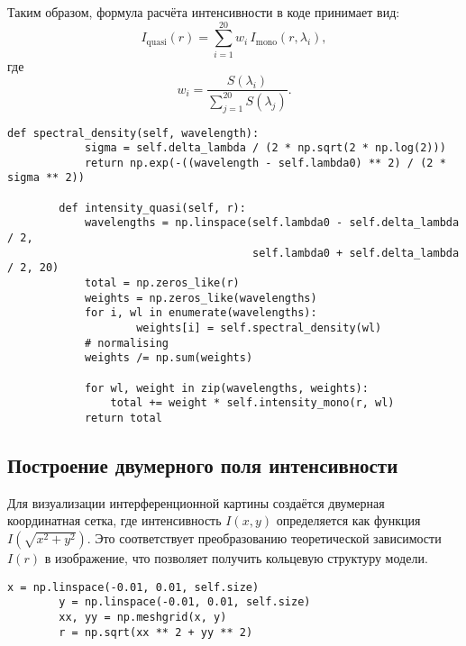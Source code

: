 \documentclass[a4paper,11pt]{article}
\theoremstyle{definition}
\begin{document}
\begin{itemize}
        Таким образом, формула расчёта интенсивности в коде принимает вид:
        \[
        I_{\text{quasi}}(r) = \sum_{i=1}^{20} w_i \, I_{\text{mono}}(r, \lambda_i),
        \]
        где
        \[
        w_i = \frac{S(\lambda_i)}{\sum_{j=1}^{20} S(\lambda_j)}.
        \]

        \begin{lstlisting}[language=MyPython,label={lst:lstlisting2}]
        def spectral_density(self, wavelength):
            sigma = self.delta_lambda / (2 * np.sqrt(2 * np.log(2)))
            return np.exp(-((wavelength - self.lambda0) ** 2) / (2 * sigma ** 2))

        def intensity_quasi(self, r):
            wavelengths = np.linspace(self.lambda0 - self.delta_lambda / 2,
                                      self.lambda0 + self.delta_lambda / 2, 20)
            total = np.zeros_like(r)
            weights = np.zeros_like(wavelengths)
            for i, wl in enumerate(wavelengths):
                    weights[i] = self.spectral_density(wl)
            # normalising
            weights /= np.sum(weights)

            for wl, weight in zip(wavelengths, weights):
                total += weight * self.intensity_mono(r, wl)
            return total
        \end{lstlisting}
    \end{itemize}


    \subsection{Построение двумерного поля интенсивности}
    Для визуализации интерференционной картины создаётся двумерная координатная сетка, где интенсивность \( I(x,y) \)
    определяется как функция \( I\left(\sqrt{x^2+y^2}\right) \). Это соответствует преобразованию теоретической
    зависимости \( I(r) \) в изображение, что позволяет получить кольцевую структуру модели.

    \begin{lstlisting}[language=MyPython,label={lst:lstlisting3}]
        x = np.linspace(-0.01, 0.01, self.size)
        y = np.linspace(-0.01, 0.01, self.size)
        xx, yy = np.meshgrid(x, y)
        r = np.sqrt(xx ** 2 + yy ** 2)
    \end{lstlisting}
\end{document}
